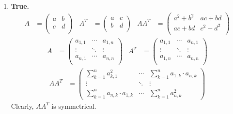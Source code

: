 \documentclass{article}
\begin{document}
\begin{enumerate}
    \item \textbf{True.}
    \begin{align*}
        A &= \begin{pmatrix}
            a & b \\ c & d \\
        \end{pmatrix} & 
        A^T &= \begin{pmatrix}
            a & c \\ b & d \\
        \end{pmatrix} & 
        AA^T &= \begin{pmatrix}
            a^2 + b^2 & ac + bd \\
            ac + bd & c^2 + d^2 \\
        \end{pmatrix}
    \end{align*}
    \begin{align*}
        A &= \begin{pmatrix}
            a_{1,1} & \cdots & a_{1,n} \\
            \vdots & \ddots & \vdots \\
            a_{n,1} & \cdots & a_{n,n} \\
        \end{pmatrix} & 
        A^T &= \begin{pmatrix}
            a_{1,1} & \cdots & a_{n,1} \\
            \vdots & \ddots & \vdots \\
            a_{1,n} & \cdots & a_{n,n} \\
        \end{pmatrix}
    \end{align*}
    \begin{align*}
        AA^T &= \begin{pmatrix}
            \sum_{k = 1}^{n} a_{k,1}^2 & \cdots & \sum_{k = 1}^{n} a_{1,k} \cdot a_{n,k} \\
            \vdots & \ddots & \vdots \\
            \sum_{k = 1}^{n} a_{n, k} \cdot a_{1,k} & \cdots & \sum_{k = 1}^{n} a_{n, k}^2
        \end{pmatrix}
    \end{align*}
    Clearly, $AA^T$ is symmetrical.
    

\end{enumerate}
\end{document}
